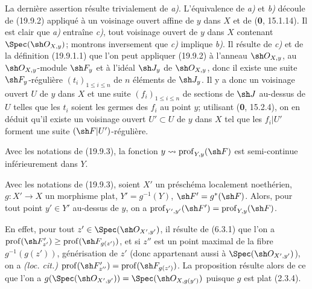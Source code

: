 La dernière assertion résulte trivialement de \emph{a)}. L'équivalence de \emph{a)} et \emph{b)} découle de (19.9.2) appliqué à un voisinage ouvert affine de $y$ dans $X$ et de (\textbf{0}, 15.1.14). Il est clair que \emph{a)} entraîne \emph{c)}, tout voisinage ouvert de $y$ dans $X$ contenant $\Spec(\sh O_{X,y})$; montrons inversement que \emph{c)} implique \emph{b)}. Il résulte de \emph{c)} et de la définition (19.9.1.1) que l'on
peut appliquer (19.9.2) à l'anneau $\sh O_{X,y}$, au $\sh O_{X,y}$-module $\sh F_y$ et à l'idéal $\sh J_y$ de $\sh O_{X,y}$, donc il existe une suite $\sh F_y$-régulière $(t_i)_{1\leq i\leq n}$ de $n$ éléments de $\sh J_y$. Il y a donc un voisinage ouvert $U$ de $y$ dans $X$ et une suite $(f_i)_{1\leq i\leq n}$ de sections de $\sh J$ au-dessus de $U$ telles que les $t_i$ soient les germes des $f_i$ au point $y$; utilisant (\textbf{0}, 15.2.4), on en déduit qu'il existe un voisinage ouvert $U'\subset U$ de $y$ dans $X$ tel que les $f_i|U'$ forment une suite $(\sh F|U')$-régulière.

\begin{corollary}[19.9.4]
\label{IV.19.9.4}
Avec les notations de \textup{(19.9.3)}, la fonction $y\leadsto\operatorname{prof}_{Y,y}(\sh F)$ est semi-continue inférieurement dans $Y$.
\end{corollary}

\begin{proposition}[19.9.5]
\label{IV.19.9.5}
Avec les notations de \textup{(19.9.3)}, soient $X'$ un préschéma localement noethérien, $g:X'\to X$ un morphisme plat, $Y'=g^{-1}(Y)$, $\sh F'=g^*(\sh F)$. Alors, pour tout point $y'\in Y'$ au-dessus de $y$, on a $\operatorname{prof}_{Y',y'}(\sh F')=\operatorname{prof}_{Y,y}(\sh F)$.
\end{proposition}

En effet, pour tout $z'\in\Spec(\sh O_{X',y'})$, il résulte de (6.3.1) que l'on a $\operatorname{prof}(\sh F'_{z'})\geq\operatorname{prof}(\sh F_{g(z')})$, et si $z''$ est un point maximal de la fibre $g^{-1}(g(z'))$, générisation de $z'$ (donc appartenant aussi à $\Spec(\sh O_{X',y'})$), on a \emph{(loc. cit.)} $\operatorname{prof}(\sh F'_{z''})=\operatorname{prof}(\sh F_{g(z')})$. La proposition résulte alors de ce que l'on a $g(\Spec(\sh O_{X',y'}))=\Spec(\sh O_{X,g(y')})$ puisque $g$ est plat (2.3.4).

